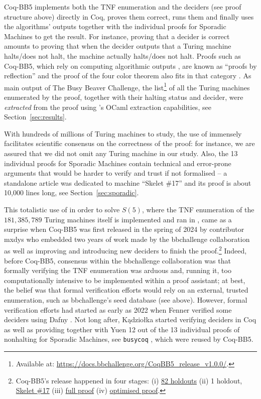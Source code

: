 \documentclass[a4paper,british]{article}
\theoremstyle{definition} %
\numberwithin{equation}{section}
\theoremstyle{definition} %
\newcommand{\BBtheFifthTNF}{181{,}385{,}789}
\newcommand{\CoqBB}{Coq-BB5\xspace}
\begin{document}
\CoqBB implements both the TNF enumeration and the deciders (see proof structure above) directly in Coq, proves them correct, runs them and finally uses the algorithms' outputs together with the individual proofs for Sporadic Machines to get the result. For instance, proving that a decider is correct amounts to proving that when the decider outputs that a Turing machine halts/does not halt, the machine actually halts/does not halt. Proofs such as \CoqBB, which rely on computing algorithmic outputs \cite{vmcompute,nativecompute}, are known as ``proofs by reflection'' \cite{boutin1997} and the \Coq proof of the four color theorem also fits in that category \cite{fourColourCoq}. As main output of The Busy Beaver Challenge, the list\footnote{Available at: \url{https://docs.bbchallenge.org/CoqBB5_release_v1.0.0/}.} of all the Turing machines enumerated by the \Coq proof, together with their halting status and decider, were \textit{extracted} from the proof using \Coq's OCaml extraction capabilities, see Section~\ref{sec:results}.

With hundreds of millions of Turing machines to study, the use of \Coq immensely facilitates scientific consensus on the correctness of the proof: for instance, we are assured that we did not omit any Turing machine in our study. Also, the 13 individual proofs for Sporadic Machines contain technical and error-prone arguments that would be harder to verify and trust if not formalised -- \eg a standalone article was dedicated to machine ``Skelet \#17'' \cite{xu2024skelet17fifthbusy} and its \Coq proof is about 10,000 lines long, see Section~\ref{sec:sporadic}.



This totalistic use of \Coq in order to solve $S(5)$, where the TNF enumeration of the $\BBtheFifthTNF$ Turing machines itself is implemented and ran in \Coq, came as a surprise when \CoqBB was first released in the spring of 2024 by contributor mxdys who embedded two years of work made by the bbchallenge collaboration as well as improving and introducing new deciders to finish the proof.\footnote{\CoqBB's release happened in four stages: (i) \href{https://discuss.bbchallenge.org/t/proving-bb-5-in-coq/225}{82 holdouts} (ii) 1 holdout, \href{https://bbchallenge.org/1RB---_0LC1RE_0LD1LC_1RA1LB_0RB0RA}{Skelet \#17} (iii) \href{https://discuss.bbchallenge.org/t/july-2nd-2024-we-have-proved-bb-5-47-176-870/237}{full proof} (iv) \href{https://github.com/ccz181078/Coq-BB5}{optimised proof}.} Indeed, before \CoqBB, consensus within the bbchallenge collaboration  was that formally verifying the TNF enumeration was arduous and, running it, too computationally intensive to be implemented within a proof assistant; at best, the belief was that formal verification efforts would rely on an external, trusted enumeration, such as bbchallenge's seed database (see above). However, formal verification efforts had started as early as 2022 when Fenner verified some deciders using Dafny \cite{dafny_fenner, Dafny}. Not long after, Kądziołka started verifying deciders in Coq as well as providing together with Yuen 12 out of the 13 individual proofs of nonhalting for Sporadic Machines, see  \texttt{busycoq} \cite{busycoq}, which were reused by \CoqBB.
\end{document}

